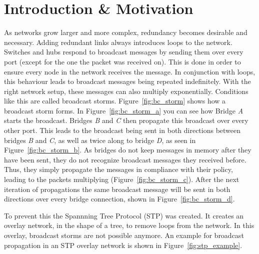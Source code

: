 \chapter{Introduction \& Motivation}
\label{introduction}
As networks grow larger and more complex, redundancy becomes desirable and necessary.
Adding redundant links always introduces loops to the network.
Switches and hubs respond to broadcast messages by sending them over every port (except for the one the packet was received on).
This is done in order to ensure every node in the network receives the message.
In conjunction with loops, this behaviour leads to broadcast messages being repeated indefinitely.
With the right network setup, these messages can also multiply exponentially. 
Conditions like this are called broadcast storms\cite{bstorm}.
Figure~\ref{fig:bc_storm} shows how a broadcast storm forms.
In Figure~\ref{fig:bc_storm_a} you can see how Bridge \textit{A} starts the broadcast.
Bridges \textit{B} and \textit{C} then propagate this broadcast over every other port.
This leads to the broadcast being sent in both directions between bridges \textit{B} and \textit{C}, as well as twice along to bridge \textit{D}, as seen in Figure~\ref{fig:bc_storm_b}.
As bridges do not keep messages in memory after they have been sent, they do not recognize broadcast messages they received before.
Thus, they simply propagate the messages in compliance with their policy, leading to the packets multiplying (Figure~\ref{fig:bc_storm_c}).
After the next iteration of propagations the same broadcast message will be sent in both directions over every bridge connection, shown in Figure~\ref{fig:bc_storm_d}.

To prevent this the Spannning Tree Protocol (STP)\cite{perlman85} was created.
It creates an overlay network, in the shape of a tree, to remove loops from the network.
In this overlay, broadcast storms are not possible anymore.
An example for broadcast propagation in an STP overlay network is shown in Figure~\ref{fig:stp_example}.

